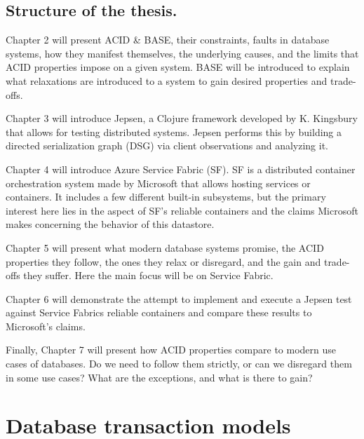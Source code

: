 \documentclass[a4paper,10pt,titlepage]{report}
\begin{document}
\section{Structure of the thesis.}

    Chapter 2 will present ACID \& BASE, their constraints, faults in database systems, how they manifest themselves, the underlying causes, and the limits that ACID properties impose on a given system. BASE will be introduced to explain what relaxations are introduced to a system to gain desired properties and trade-offs.\\
    \vspace{5mm}

    Chapter 3 will introduce Jepsen, a Clojure framework\cite{jepsonio} developed by K. Kingsbury that allows for testing distributed systems. Jepsen performs this by building a directed serialization graph (DSG) via client observations and analyzing it. \\
    \vspace{5mm}

    Chapter 4 will introduce Azure Service Fabric (SF). SF is a distributed container orchestration system made by Microsoft that allows hosting services or containers. It includes a few different built-in subsystems, but the primary interest here lies in the aspect of SF's reliable containers and the claims Microsoft makes concerning the behavior of this datastore.\\
    \vspace{5mm}

    Chapter 5 will present what modern database systems promise, the ACID properties they follow, the ones they relax or disregard, and the gain and trade-offs they suffer. Here the main focus will be on Service Fabric.\\
    \vspace{5mm}

    Chapter 6 will demonstrate the attempt to implement and execute a Jepsen test against Service Fabrics reliable containers and compare these results to Microsoft's claims.\\
    \vspace{5mm}

    Finally, Chapter 7 will present how ACID properties compare to modern use cases of databases. Do we need to follow them strictly, or can we disregard them in some use cases? What are the exceptions, and what is there to gain?\\

    \chapter{Database transaction models}
\end{document}
